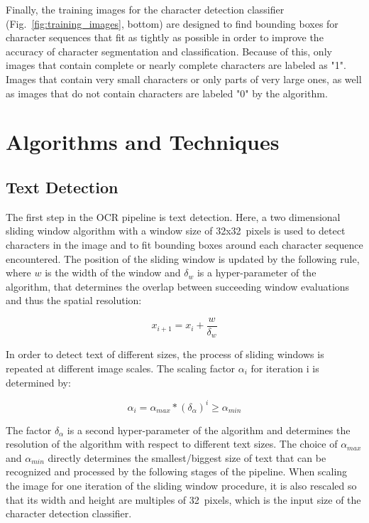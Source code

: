 \documentclass[12pt]{article}
\newcommand\figref[1]{Fig.~\ref{fig:#1}}
\begin{document}
Finally, the training images for the character detection classifier (\figref{training_images}, bottom) are
designed to find bounding boxes for character sequences that fit as tightly as possible in order to improve
the accuracy of character segmentation and classification.
%
Because of this, only images that contain complete or nearly complete characters are labeled
as "1". Images that contain very small characters or only parts of very large ones, as well
as images that do not contain characters are labeled "0" by the algorithm.

\section{Algorithms and Techniques}
\subsection{Text Detection}
\label{sec:detection_algorithm}
The first step in the OCR pipeline is text detection.
%
Here, a two dimensional sliding window algorithm with a window size of 32x32~pixels is used to detect characters in the image and to fit bounding boxes
around each character sequence encountered. The position of the sliding window is updated by the
following rule, where $w$ is the width of the window and $\delta_w$ is a hyper-parameter of the
algorithm, that determines the overlap between succeeding window evaluations and thus the
spatial resolution:

\begin{equation}
  x_{i+1} = x_i + \frac{w}{\delta_w}
\end{equation}

In order to detect text of different sizes, the process of sliding windows is repeated at different
image scales. The scaling factor $\alpha_i$ for iteration i is determined by:

\begin{equation}
  \alpha_i = \alpha_{max} * (\delta_\alpha)^i  \ge \alpha_{min}
\end{equation}

The factor $\delta_\alpha$ is a second hyper-parameter of the algorithm and determines the
resolution of the algorithm with respect to different text sizes.
The choice of $\alpha_{max}$ and $\alpha_{min}$ directly determines the
smallest/biggest size of text that can be recognized and processed by the following stages of the
pipeline.
When scaling the image for one iteration of the sliding window procedure, it is also rescaled
so that its width and height are multiples of 32~pixels, which is the input size of the character detection
classifier.
\end{document}
